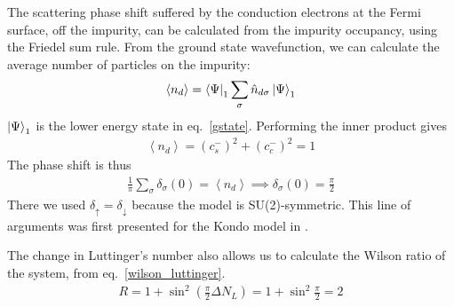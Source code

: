 \documentclass{report}
\numberwithin{equation}{section}
\begin{document}
The scattering phase shift suffered by the conduction electrons at the Fermi surface, off the impurity, can be calculated from the impurity occupancy, using the Friedel sum rule. From the ground state wavefunction, we can calculate the average number of particles on the impurity:
\begin{equation}\begin{aligned}
	\left<n_d \right> = \bra{\Psi}_1\sum_\sigma \hat n_{d\sigma} \ket{\Psi}_1
\end{aligned}\end{equation}
\(\ket{\Psi}_1\) is the lower energy state in eq.~\eqref{gstate}. Performing the inner product gives
\begin{equation}\begin{aligned}
	\left<n_d \right> = \left( c_s^- \right)^2 + \left( c_c^- \right)^2 = 1
\end{aligned}\end{equation}
The phase shift is thus
\begin{equation}\begin{aligned}
	\frac{1}{\pi}\sum_\sigma \delta_\sigma(0) = \left<n_d \right> \implies \delta_\sigma(0) = \frac{\pi}{2}
\end{aligned}\end{equation}
There we used \(\delta_\uparrow = \delta_\downarrow\) because the model is SU(2)-symmetric. This line of arguments was first presented for the Kondo model in \cite{martin1982fermi}.

The change in Luttinger's number also allows us to calculate the Wilson ratio of the system, from eq.~\eqref{wilson_luttinger}.
\begin{equation}\begin{aligned}
	R = 1 + \sin^2 \left( \frac{\pi}{2}\Delta N_L \right) = 1 + \sin^2 \frac{\pi}{2} = 2
\end{aligned}\end{equation}
\end{document}
